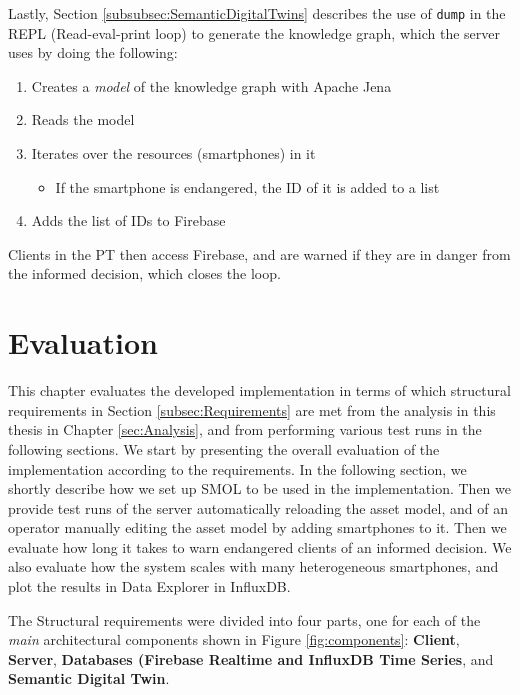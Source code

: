 \documentclass{article}
\begin{document}
Lastly, Section \ref{subsubsec:SemanticDigitalTwins} describes the use of \verb|dump| in the REPL (Read-eval-print loop) to generate the knowledge graph, which the server uses by doing the following:
\begin{enumerate}
    \item Creates a \emph{model} of the knowledge graph with Apache Jena
    \item Reads the model
    \item Iterates over the resources (smartphones) in it
    \begin{itemize}
        \item If the smartphone is endangered, the ID of it is added to a list 
    \end{itemize}
    \item Adds the list of IDs to Firebase
\end{enumerate}

Clients in the PT then access Firebase, and are warned if they are in danger from the informed decision, which closes the loop.

\section{Evaluation}\label{sec:Evaluation}
This chapter evaluates the developed implementation in terms of which structural requirements in Section \ref{subsec:Requirements} are met from the analysis in this thesis in Chapter \ref{sec:Analysis}, and from performing various test runs in the following sections. We start by presenting the overall evaluation of the implementation according to the requirements. In the following section, we shortly describe how we set up SMOL to be used in the implementation. Then we provide test runs of the server automatically reloading the asset model, and of an operator manually editing the asset model by adding smartphones to it. Then we evaluate how long it takes to warn endangered clients of an informed decision. We also evaluate how the system scales with many heterogeneous smartphones, and plot the results in Data Explorer in InfluxDB.

The Structural requirements were divided into four parts, one for each of the \emph{main} architectural components shown in Figure \ref{fig:components}: \textbf{Client}, \textbf{Server}, \textbf{Databases (\textbf{Firebase Realtime} and \textbf{InfluxDB Time Series}}, and \textbf{Semantic Digital Twin}. 
\end{document}
